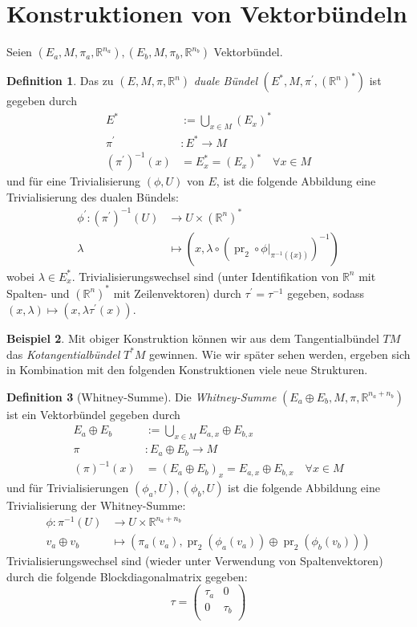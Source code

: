 \documentclass[a4paper]{scrreprt}
\numberwithin{equation}{chapter}
\DeclareMathOperator{\pr}{pr}
\newcommand{\R}{\mathbb{R}}
\theoremstyle{definition}
\newtheorem{defn}{Definition}[section]
\newtheorem{bsp}[defn]{Beispiel}
\begin{document}
	\section{Konstruktionen von Vektorbündeln}
		Seien $(E_a,M,\pi_a,\R^{n_a}),(E_b,M,\pi_b,\R^{n_b})$ Vektorbündel.\\
		\begin{defn}
			Das zu $(E,M,\pi,\R^{n})$ \emph{duale Bündel} $(E^*,M,\pi^{\prime},(\R^n)^*)$ ist gegeben durch
			\begin{align*}
				E^*&:=\bigcup_{x\in M}(E_{x})^*\\
				\pi^{\prime}&\colon E^*\rightarrow M\\
				(\pi^{\prime})^{-1}(x)&=E^*_x=(E_{x})^*\quad \forall x\in M
			\end{align*}
			und für eine Trivialisierung $(\phi,U)$ von $E$, ist die folgende Abbildung eine Trivialisierung des dualen Bündels:
			\begin{align*}
				\phi^{\prime}\colon(\pi^{\prime})^{-1}(U)&\rightarrow U\times (\R^n)^*\\
				\lambda&\mapsto\left(x,\lambda\circ(\pr_2\circ\phi\vert_{\pi^{-1}(\lbrace x\rbrace)})^{-1}\right)
			\end{align*}
			wobei $\lambda\in E_x^*$. Trivialisierungswechsel sind (unter Identifikation von $\R^n$ mit Spalten- und $(\R^n)^*$ mit Zeilenvektoren) durch $\tau^{\prime}=\tau^{-1}$ gegeben, sodass $(x,\lambda)\mapsto(x,\lambda\tau^{\prime}(x))$.
		\end{defn}
		\begin{bsp}
			Mit obiger Konstruktion können wir aus dem Tangentialbündel $TM$ das \emph{Kotangentialbündel} $T^*M$ gewinnen. Wie wir später sehen werden, ergeben sich in Kombination mit den folgenden Konstruktionen viele neue Strukturen.
		\end{bsp}
		\begin{defn}[Whitney-Summe]
			Die \emph{Whitney-Summe} $(E_a\oplus E_b ,M,\pi,\R^{n_a+n_b})$ ist ein Vektorbündel gegeben durch
			\begin{align*}
				E_a\oplus E_b&:=\bigcup_{x\in M}E_{a,x}\oplus E_{b,x}\\
				\pi&\colon E_a\oplus E_b\rightarrow M\\
				(\pi)^{-1}(x)&=(E_a\oplus E_b)_x=E_{a,x}\oplus E_{b,x}\quad \forall x\in M
			\end{align*}
			und für Trivialisierungen $(\phi_a,U),(\phi_b,U)$ ist die folgende Abbildung eine Trivialisierung der Whitney-Summe:
			\begin{align*}
				\phi\colon\pi^{-1}(U)&\rightarrow U\times \R^{n_a+n_b}\\
				v_a\oplus v_b&\mapsto (\pi_a(v_a), \pr_2(\phi_a(v_a))\oplus\pr_2(\phi_b(v_b)))
			\end{align*}
			Trivialisierungswechsel sind (wieder unter Verwendung von Spaltenvektoren) durch die folgende Blockdiagonalmatrix gegeben: 
			\begin{equation}
				\tau=\left(\begin{array}{cc}\tau_a&0\\0&\tau_b\\ \end{array}\right)
			\end{equation}
		\end{defn}
\end{document}
